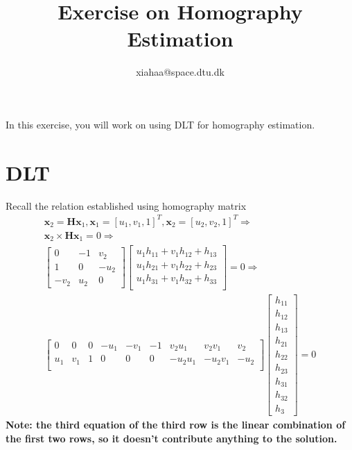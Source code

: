 \documentclass[a4paper]{article}
\begin{document}
\title{Exercise on Homography Estimation}
\author{xiahaa@space.dtu.dk}
\maketitle%

In this exercise, you will work on using DLT for homography estimation.

\section{DLT}
Recall the relation established using homography matrix
\begin{align*}
\mathbf{x}_2 = \mathbf{Hx}_1, \mathbf{x}_1 = [u_1,v_1,1]^T, \mathbf{x}_2 = [u_2,v_2,1]^T \Rightarrow \\
\mathbf{x}_2 \times \mathbf{Hx}_1 = 0 \Rightarrow \\
\left[
\begin{matrix}
0 & -1 & v_2 \\
1 & 0 & -u_2 \\
-v_2 & u_2 & 0
\end{matrix}
\right]
\left[
\begin{matrix}
u_1h_{11}+v_1h_{12}+h_{13}\\
u_1h_{21}+v_1h_{22}+h_{23}\\
u_1h_{31}+v_1h_{32}+h_{33}\\
\end{matrix}
\right]=0 \Rightarrow \\
\left[
\begin{matrix}
0 & 0 & 0 & -u_1 & -v_1 & -1 & v_2u_1 & v_2v_1 & v_2 \\
u_1 & v_1 & 1 & 0 & 0 & 0 & -u_2u_1 & -u_2v_1 & -u_2 \\
\end{matrix}
\right]
\left[
\begin{matrix}
h_{11} \\ h_{12}\\h_{13}\\h_{21}\\h_{22}\\h_{23}\\h_{31}\\h_{32}\\h_{3}
\end{matrix}
\right]=0 
\end{align*}
\textbf{Note: the third equation of the third row is the linear combination of the first two rows, so it doesn't contribute anything to the solution.}
\end{document}
